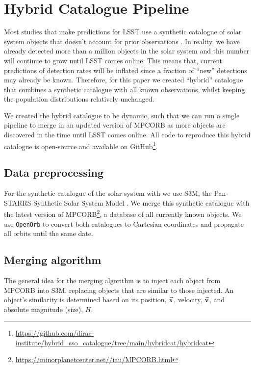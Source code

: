 \documentclass[twocolumn]{aastex631}
\newcommand{\needcite}{{\color{magenta}{(needs citation)}}}
\newcommand{\sss}{S3M}
\newcommand{\mpco}{MPCORB}
\begin{document}

{}

\restartappendixnumbering

\allowdisplaybreaks
\appendix

\section{Hybrid Catalogue Pipeline}\label{app:hybrid}
Most studies that make predictions for LSST use a synthetic catalogue of solar system objects that doesn't account for prior observations \needcite{}. In reality, we have already detected more than a million objects in the solar system and this number will continue to grow until LSST comes online. This means that, current predictions of detection rates will be inflated since a fraction of ``new'' detections may already be known. Therefore, for this paper we created ``hybrid'' catalogue that combines a synthetic catalogue with all known observations, whilst keeping the population distributions relatively unchanged.

We created the hybrid catalogue to be dynamic, such that we can run a single pipeline to merge in an updated version of \mpco{} as more objects are discovered in the time until LSST comes online. All code to reproduce this hybrid catalogue is open-source and available on GitHub\footnote{\url{https://github.com/dirac-institute/hybrid_sso_catalogue/tree/main/hybridcat/hybridcat}}.

\subsection{Data preprocessing}
For the synthetic catalogue of the solar system with we use \sss{}, the Pan-STARRS Synthetic Solar System Model \citep[\sss{}][]{Grav+2011}. We merge this synthetic catalogue with the latest version of \mpco{}\footnote{\url{https://minorplanetcenter.net//iau/MPCORB.html}}, a database of all currently known objects. We use \texttt{OpenOrb} \citep{Granvik+2009} to convert both catalogues to Cartesian coordinates and propagate all orbits until the same date.

\subsection{Merging algorithm}
The general idea for the merging algorithm is to inject each object from \mpco{} into \sss{}, replacing objects that are similar to those injected. An object's similarity is determined based on its position, $\va{x}$, velocity, $\va{v}$, and absolute magnitude (size), ${H}$.
\end{document}
